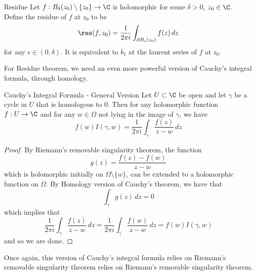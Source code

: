 \documentclass[a4paper]{article}
\begin{document}
\begin{defn}{Residue}{} Let $f:B_\delta(z_0)\setminus\{z_0\}\to\C$ is holomorphic for some $\delta>0$, $z_0\in\C$. Define the residue of $f$ at $z_0$ to be $$\res(f,z_0)=\frac{1}{2\pi i}\int_{\partial B_{\epsilon}(z_0)}f(z)\,dz$$ for any $\epsilon\in(0,\delta)$. It is equivalent to $b_1$ at the laurent series of $f$ at $z_0$. 
\end{defn}

For Residue theorem, we need an even more powerful version of Cauchy's integral formula, through homology. 

\begin{thm}{Cauchy's Integral Formula - General Version}{} Let $U\subset\C$ be open and let $\gamma$ be a cycle in $U$ that is homologous to $0$. Then for any holomorphic function $f:U\to\C$ and for any $w\in\Omega$ not lying in the image of $\gamma$, we have $$f(w)I(\gamma,w)=\frac{1}{2\pi i}\int_\gamma\frac{f(z)}{z-w}\,dz$$ 
\begin{proof}
By Riemann's removable singularity theorem, the function $$g(z)=\frac{f(z)-f(w)}{z-w}$$ which is holomorphic initially on $\Omega\setminus\{w\}$, can be extended to a holomorphic function on $\Omega$. By Homology version of Cauchy's theorem, we have that $$\int_\gamma g(z)\,dz=0$$ which implies that $$\frac{1}{2\pi i}\int_\gamma\frac{f(z)}{z-w}\,dz=\frac{1}{2\pi i}\int_\gamma\frac{f(w)}{z-w}\,dz=f(w)I(\gamma,w)$$ and so we are done. 
\end{proof}
\end{thm}

Once again, this version of Cauchy's integral formula relies on Riemann's removable singularity theorem relies on Riemann's removable singularity theorem. 
\end{document}
